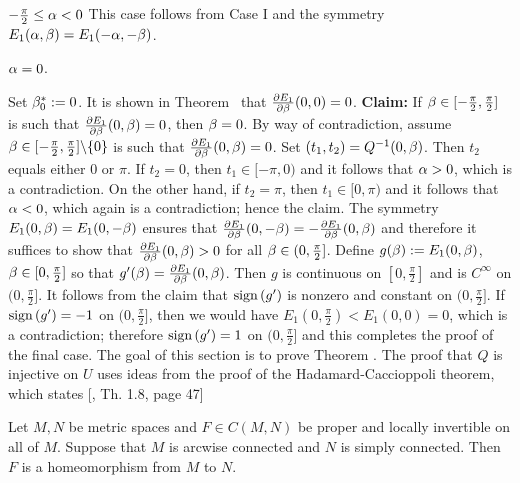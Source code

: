  $-\frac\pi2\leq\alpha<0$
This case follows from Case I and the symmetry $E_1(\alpha,\beta)=E_1(-\alpha,-\beta)$.

 $\alpha=0$.

Set $\beta_0^*:=0$. It is shown in Theorem \Tconsistent\ that $\frac{\partial E_1}{\partial\beta}(0,0)=0$.\newline
{\bf Claim:} If $\beta\in [-\frac\pi2,\frac\pi2]$ is such that 
$\frac{\partial E_1}{\partial\beta}(0,\beta)=0$, then $\beta=0$.
By way of contradiction, assume $\beta\in [-\frac\pi2,\frac\pi2]\backslash\{0\}$ is such that
$\frac{\partial E_1}{\partial\beta}(0,\beta)=0$. Set $(t_1,t_2)=Q^{-1}(0,\beta)$. Then
$t_2$ equals either $0$ or $\pi$. If $t_2=0$, then $t_1\in[-\pi,0)$ and it follows that $\alpha>0$, which is
a contradiction. On the other hand, if $t_2=\pi$, then  $t_1\in[0,\pi)$ and it follows that $\alpha<0$, which 
again is a contradiction; hence the claim.
\enddemo
The symmetry $E_1(0,\beta)=E_1(0,-\beta)$ ensures that 
$\frac{\partial E_1}{\partial\beta}(0,-\beta)=-\frac{\partial E_1}{\partial\beta}(0,\beta)$ and therefore it suffices
to show that $\frac{\partial E_1}{\partial\beta}(0,\beta)>0$ for all $\beta\in (0,\frac\pi2]$.
Define $g(\beta):=E_1(0,\beta)$, $\beta\in [0,\frac\pi2]$ so that 
$g'(\beta)=\frac{\partial E_1}{\partial\beta}(0,\beta)$.
Then $g$ is continuous on $[0,\frac\pi2]$
and is $C^\infty$ on $(0,\frac\pi2]$. 
It follows from the claim that $\text{sign}\left( {g'} \right)$ is nonzero and constant on  $(0,\frac\pi2]$.
If $\text{sign}\left( {g'} \right)=-1$ on 
$(0,\frac\pi2]$, then we would have $E_1(0,\frac\pi2)<E_1(0,0)=0$, which is a contradiction; therefore $\text{sign}\left( {g'} \right)=1$ on 
$(0,\frac\pi2]$ and this completes the proof of the final case.
%
%
The goal of this section is to prove Theorem \inject. The proof that
$Q$ is injective on $U$ uses ideas from the proof of the
Hadamard-Caccioppoli theorem, which states [{\AmProdi}, Th. 1.8,
page 47]

 Let $M,N$ be metric
spaces and $F\in C(M,N)$ be proper and locally invertible on all
of $M$. Suppose that $M$ is arcwise connected and $N$ is simply
connected. Then $F$ is a homeomorphism from $M$ to $N$.
\endproclaim

